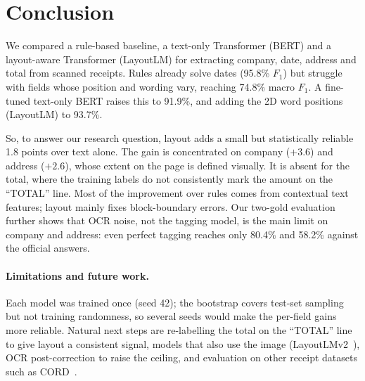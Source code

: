 
\section{Conclusion}
\label{sec:conclusion}

We compared a rule-based baseline, a text-only Transformer (BERT) and a
layout-aware Transformer (LayoutLM) for extracting company, date,
address and total from scanned receipts. Rules already solve dates
(95.8\% $F_1$) but struggle with fields whose position and wording vary,
reaching 74.8\% macro $F_1$. A fine-tuned text-only BERT raises this to
91.9\%, and adding the 2D word positions (LayoutLM) to 93.7\%.

So, to answer our research question, layout adds a small but
statistically reliable 1.8 points over text alone. The gain is
concentrated on company ($+3.6$) and address ($+2.6$), whose extent on
the page is defined visually. It is absent for the total, where the
training labels do not consistently mark the amount on the ``TOTAL''
line. Most of the improvement over rules comes from contextual text
features; layout mainly fixes block-boundary errors. Our two-gold
evaluation further shows that OCR noise, not the tagging model, is the
main limit on company and address: even perfect tagging reaches only
80.4\% and 58.2\% against the official answers.

\paragraph{Limitations and future work.} Each model was trained once
(seed 42); the bootstrap covers test-set sampling but not training
randomness, so several seeds would make the per-field gains more
reliable. Natural next steps are re-labelling the total on the
``TOTAL'' line to give layout a consistent signal, models that also use
the image (LayoutLMv2~\cite{xu2021layoutlmv2}), OCR post-correction to
raise the ceiling, and evaluation on other receipt datasets such as
CORD~\cite{park2019cord}.
